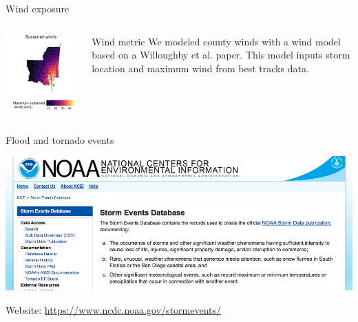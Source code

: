 \documentclass[ignorenonframetext,]{beamer}
\begin{document}
\begin{frame}{Wind exposure}

\begin{columns}
\begin{column}{0.5\textwidth}

\begin{center}\includegraphics[width=\textwidth]{modeled_winds} \end{center}
\end{column}
\begin{column}{0.5\textwidth}
\small
\begin{block}{Wind metric}
We modeled county winds with a wind model based on a Willoughby et al. paper. This model inputs storm location and maximum wind from best tracks data. 
\end{block}
\end{column}
\end{columns}

\end{frame}

\begin{frame}{Flood and tornado events}

\includegraphics[width=\textwidth]{noaastormevents}

Website: \url{https://www.ncdc.noaa.gov/stormevents/}

\end{frame}
\end{document}
